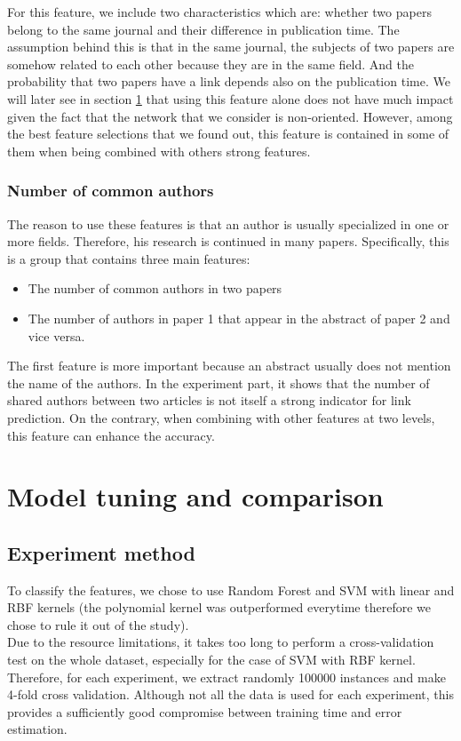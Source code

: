 \documentclass{article}
\begin{document}
For this feature, we include two characteristics which are: whether two papers belong to the same journal and their difference in publication time. The assumption behind this is that in the same journal, the subjects of two papers are somehow related to each other because they are in the same field. And the probability that two papers have a link depends also on the publication time. We will later see in section \ref{sec:experiments} that using this feature alone does not have much impact given the fact that the network that we consider is non-oriented. However, among the best feature selections that we found out, this feature is contained in some of them when being combined with others strong features.

\subsubsection{Number of common authors}

The reason to use these features is that an author is usually specialized in one or more fields. Therefore, his research is continued in many papers. Specifically, this is a group that contains three main features:
\begin{itemize}
\item The number of common authors in two papers
\item The number of authors in paper 1 that appear in the abstract of paper 2 and vice versa.
\end{itemize}
The first feature is more important because an abstract usually does not mention the name of the authors. In the experiment part, it shows that the number of shared authors between two articles is not itself a strong indicator for link prediction. On the contrary, when combining with other features at two levels, this feature can enhance the accuracy.

\section{Model tuning and comparison}
\label{sec:experiments}

\subsection{Experiment method}

To classify the features, we chose to use Random Forest and SVM with linear and RBF kernels (the polynomial kernel was outperformed everytime therefore we chose to rule it out of the study).\\
Due to the resource limitations, it takes too long to perform a cross-validation test on the whole dataset, especially for the case of SVM with RBF kernel. Therefore, for each experiment, we extract randomly 100000 instances and make 4-fold cross validation. Although not all the data is used for each experiment, this provides a sufficiently good compromise between training time and error estimation.
\end{document}
